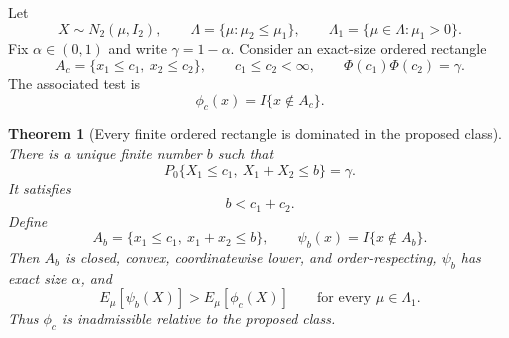 \documentclass[12pt]{article}
\newtheorem{theorem}{Theorem}
\theoremstyle{definition}
\theoremstyle{remark}
\begin{document}
Let
\[
X\sim N_2(\mu,I_2),
\qquad
\Lambda=\{\mu:\mu_2\le\mu_1\},
\qquad
\Lambda_1=\{\mu\in\Lambda:\mu_1>0\}.
\]
Fix $\alpha\in(0,1)$ and write $\gamma=1-\alpha$.  Consider an exact-size ordered rectangle
\[
A_c=\{x_1\le c_1,\ x_2\le c_2\},
\qquad
c_1\le c_2<\infty,
\qquad
\Phi(c_1)\Phi(c_2)=\gamma.
\]
The associated test is
\[
\phi_c(x)=I\{x\notin A_c\}.
\]

\begin{theorem}[Every finite ordered rectangle is dominated in the proposed class]
There is a unique finite number $b$ such that
\begin{equation}\label{eq:calibration}
P_0\{X_1\le c_1,\ X_1+X_2\le b\}=\gamma.
\end{equation}
It satisfies
\begin{equation}\label{eq:b-strict}
b<c_1+c_2.
\end{equation}
Define
\[
A_b=\{x_1\le c_1,\ x_1+x_2\le b\},
\qquad
\psi_b(x)=I\{x\notin A_b\}.
\]
Then $A_b$ is closed, convex, coordinatewise lower, and order-respecting, $\psi_b$ has exact size $\alpha$, and
\[
E_\mu[\psi_b(X)]>E_\mu[\phi_c(X)]
\qquad
\text{for every }\mu\in\Lambda_1.
\]
Thus $\phi_c$ is inadmissible relative to the proposed class.
\end{theorem}
\end{document}
